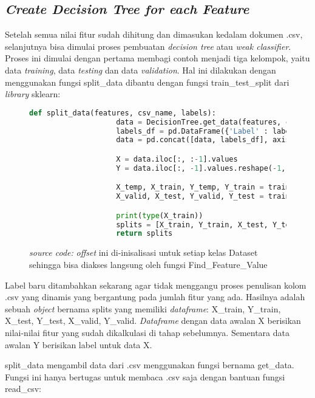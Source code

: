 	\subsection{\textit{Create Decision Tree for each Feature}}
		Setelah semua nilai fitur sudah dihitung dan dimasukan kedalam dokumen .csv, 
		selanjutnya bisa dimulai proses pembuatan \emph{decision tree} atau \emph{weak classifier}. 
		Proses ini dimulai dengan pertama membagi contoh menjadi tiga kelompok, yaitu data \emph{training}, 
		data \emph{testing} dan data \emph{validation}. Hal ini dilakukan dengan menggunakan fungsi 
		split\_data dibantu dengan fungsi train\_test\_split dari \textit{library} sklearn:

		\begin{figure}[H]
			\begin{lstlisting}[language=Python, basicstyle=\tiny]
				def split_data(features, csv_name, labels):
					data = DecisionTree.get_data(features, csv_name)
					labels_df = pd.DataFrame({'Label' : labels})
					data = pd.concat([data, labels_df], axis=1)

					X = data.iloc[:, :-1].values 
					Y = data.iloc[:, -1].values.reshape(-1, 1)

					X_temp, X_train, Y_temp, Y_train = train_test_split(X, Y, test_size=0.3, random_state=42)
					X_valid, X_test, Y_valid, Y_test = train_test_split(X_temp, Y_temp, test_size=0.5, random_state=42)

					print(type(X_train))
					splits = [X_train, Y_train, X_test, Y_test, X_valid, Y_valid]
					return splits
			\end{lstlisting}
			\caption{\emph{source code:} \textit{offset} ini di-inisalisasi untuk setiap kelas Dataset 
			sehingga bisa diakses langsung oleh fungsi Find\_Feature\_Value}
			\label{code: spliting dataset}
		\end{figure}

		Label baru ditambahkan sekarang agar tidak menggangu proses penulisan kolom .csv yang dinamis 
		yang bergantung pada jumlah fitur yang ada. Hasilnya adalah sebuah \textit{object} bernama splits 
		yang memiliki \textit{dataframe}: X\_train, Y\_train, X\_test, Y\_test, X\_valid, Y\_valid. \textit{Dataframe} 
		dengan data awalan X berisikan nilai-nilai fitur yang sudah dikalkulasi di tahap sebelumnya. 
		Sementara data awalan Y berisikan label untuk data X.

		split\_data mengambil data dari .csv menggunakan fungsi bernama get\_data. Fungsi ini 
		hanya bertugas untuk membaca .csv saja dengan bantuan fungsi read\_csv:
		
